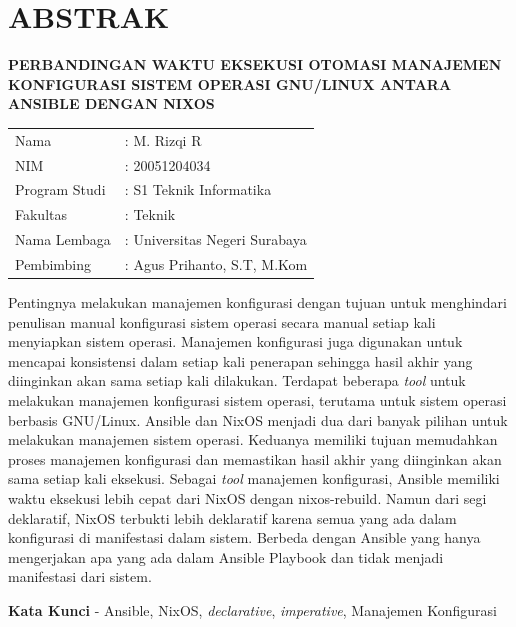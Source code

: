 \documentclass[10pt,]{report}
\begin{document}
\chapter*{ABSTRAK}
\begin{adjustwidth}{0.0cm}{}
  \begin{center}
    \textbf{PERBANDINGAN WAKTU EKSEKUSI OTOMASI MANAJEMEN KONFIGURASI SISTEM OPERASI GNU/LINUX ANTARA ANSIBLE DENGAN NIXOS}
  \end{center}
  \medskip
	\begin{adjustwidth}{0.0cm}{}
    \begin{tabular}{@{}ll}
			Nama          & : M. Rizqi R        \\
			NIM            & : 20051204034 \\
			Program Studi            & : S1 Teknik Informatika                        \\
			Fakultas & : Teknik \\
      Nama Lembaga & : Universitas Negeri Surabaya \\
      Pembimbing & : Agus Prihanto, S.T, M.Kom \\
		\end{tabular}
	\end{adjustwidth}
  \medskip

	Pentingnya melakukan manajemen konfigurasi dengan tujuan untuk menghindari
	penulisan manual konfigurasi sistem operasi secara manual setiap kali
	menyiapkan sistem operasi. Manajemen konfigurasi juga digunakan untuk
	mencapai konsistensi dalam setiap kali penerapan sehingga hasil akhir yang
	diinginkan akan sama setiap kali dilakukan.
  Terdapat beberapa \textit{tool} untuk melakukan manajemen konfigurasi sistem operasi,
	terutama untuk sistem operasi berbasis GNU/Linux. Ansible dan NixOS menjadi
	dua dari banyak pilihan untuk melakukan manajemen sistem operasi. Keduanya
	memiliki tujuan memudahkan proses manajemen konfigurasi dan memastikan hasil
  akhir yang diinginkan akan sama setiap kali eksekusi. Sebagai \textit{tool}
  manajemen konfigurasi, Ansible memiliki waktu eksekusi lebih cepat dari NixOS 
  dengan nixos-rebuild. Namun dari segi deklaratif, NixOS terbukti lebih deklaratif 
  karena semua yang ada dalam konfigurasi di manifestasi dalam sistem. Berbeda 
  dengan Ansible yang hanya mengerjakan apa yang ada dalam Ansible Playbook dan 
  tidak menjadi manifestasi dari sistem.
  \medskip

  \noindent\textbf{Kata Kunci} - Ansible, NixOS, \textit{declarative}, \textit{imperative},
  Manajemen Konfigurasi
\end{adjustwidth}
\newpage
\end{document}
